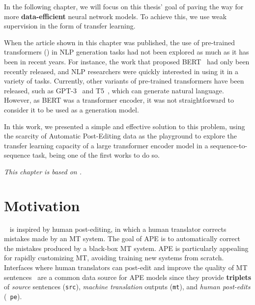 \label{chap:ape}

\cleardoublepage
\doublespacing

\noindent In the following chapter, we will focus on this thesis' goal of
paving the way for more \textbf{data-efficient} neural network
models. To achieve this, we use weak supervision in the form of
transfer learning.

When the article shown in this chapter was published, the use of
pre-trained transformers () in NLP
generation tasks had not been explored as much as it has been in
recent years. For instance, the work that proposed
BERT~\citep{devlin2018bert} had only been recently released, and NLP
researchers were quickly interested in using it in a variety of
tasks. Currently, other variants of pre-trained transformers have
been released, such as GPT-3~\citep{brown2020language} and
T5~\citep{raffel2020Exploringlimitstransfer}, which can generate
natural language. However, as BERT was a transformer encoder, it was
not straightforward to consider it to be used as a generation model.

In this work, we presented a simple and effective solution to this
problem, using the scarcity of Automatic Post-Editing data as the
playground to explore the transfer learning capacity of a large
transformer encoder model in a sequence-to-sequence task, being one
of the first works to do so.

\emph{This chapter is based on \citet*{Correia2019}.}

\section{Motivation}

~\citep[APE;][]{simard2007rule} is
inspired by human post-editing, in which a human translator corrects
mistakes made by an MT system.
The goal of APE is to automatically correct the mistakes produced by
a black-box MT system. APE is particularly
appealing for rapidly customizing MT, avoiding training new systems
from scratch. Interfaces where human translators can post-edit and
improve the quality of MT
sentences~\citep{Alabau2014,Federico2014,Denkowski2015,Hokamp2018}
are a common data source for APE models since they provide {\bf
        triplets} of {\it source} sentences ({\tt src}), {\it machine
        translation} outputs ({\tt mt}), and {\it human post-edits} ({\tt
        pe}).

